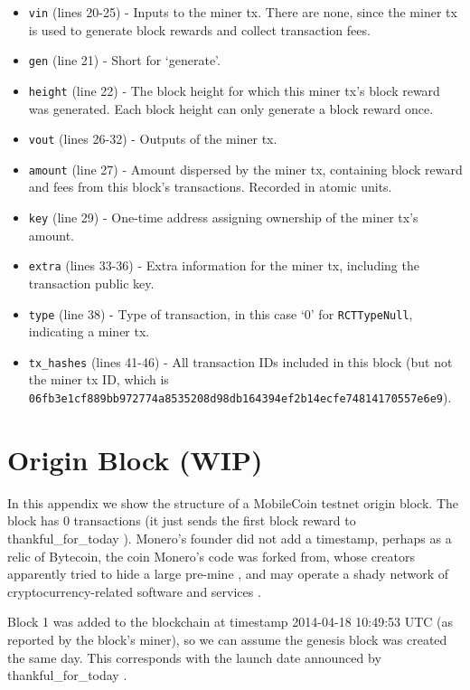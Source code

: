 \begin{appendices}
\begin{itemize}
    \item {\tt vin} (lines 20-25) - Inputs to the miner tx. There are none, since the miner tx is used to generate block rewards and collect transaction fees.
    \item {\tt gen} (line 21) - Short for `generate'.
    \item {\tt height} (line 22) - The block height for which this miner tx's block reward was generated. Each block height can only generate a block reward once.
    \item {\tt vout} (lines 26-32) - Outputs of the miner tx.
    \item {\tt amount} (line 27) - Amount dispersed by the miner tx, containing block reward and fees from this block's transactions. Recorded in atomic units.
    \item {\tt key} (line 29) - One-time address assigning ownership of the miner tx's amount.
    \item {\tt extra} (lines 33-36) - Extra information for the miner tx, including the transaction public key.
    \item {\tt type} (line 38) - Type of transaction, in this case `0' for {\tt RCTTypeNull}, indicating a miner tx.
    \item {\tt tx\_hashes} (lines 41-46) - All transaction IDs included in this block (but not the miner tx ID, which is {\tt 06fb3e1cf889bb972774a8535208d98db164394ef2b14ecfe74814170557e6e9}).
\end{itemize}
\fi



\chapter{Origin Block (WIP)}
\label{appendix:origin-block}

In this appendix we show the structure of a MobileCoin testnet origin block. The block has 0 transactions (it just sends the first block reward to thankful\_for\_today \cite{bitmonero-launched}). Monero's founder did not add a timestamp, perhaps as a relic of Bytecoin, the coin Monero's code was forked from, whose creators apparently tried to hide a large pre-mine \cite{monero-history}, and may operate a shady network of cryptocurrency-related software and services \cite{bytecoin-network}.

Block 1 was added to the blockchain at timestamp 2014-04-18 10:49:53 UTC (as reported by the block's miner), so we can assume the genesis block was created the same day. This corresponds with the launch date announced by thankful\_for\_today \cite{bitmonero-launched}.


\end{appendices}
